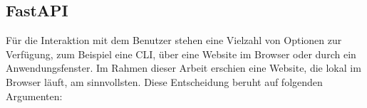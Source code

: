 \subsection{FastAPI}

Für die Interaktion mit dem Benutzer stehen eine Vielzahl von Optionen zur Verfügung, zum Beispiel eine CLI, über eine Website im Browser oder durch ein Anwendungsfenster.
Im Rahmen dieser Arbeit erschien eine Website, die lokal im Browser läuft, am sinnvollsten. Diese Entscheidung beruht auf folgenden Argumenten:


